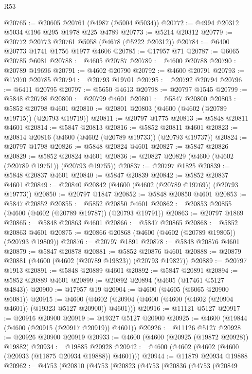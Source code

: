 \begin{lexlean}{R53}
\begin{coremodule}
@20765 := @20605 @20761 (@4987 (@5004 @5034))
@20772 := @4994 @20312 @5034 @196 @295 @1978 @225 @4789
@20773 := @5214 @20312
@20779 := @20772 @20773 @20761 @5058 (@4678 (@5222 @20312))
@20784 := @6400 @20773 @1741 @1756 @1977 @4606
@20785 := @17957 @71
@20787 := @6065 @20785 @6081
@20788 := @4605 @20787
@20789 := @4600 @20788
@20790 := @20789 @19696
@20791 := @4602 @20790
@20792 := @4600 @20791
@20793 := @17970 @20785
@20794 := @20793 @19701
@20795 := @20792 @20794
@20796 := @6411 @20795
@20797 := @5650 @4613
@20798 := @20797 @1545
@20799 := @5848 @20798
@20800 := @20799 @4601
@20801 := @5847 @20800
@20803 := @5852 @20798 @4601
@20810 := @20801 @20803 (@4600 (@4602 (@20789 @19715)) (@20793 @19719))
@20811 := @20797 @1775
@20813 := @5848 @20811 @4601
@20814 := @5847 @20813
@20816 := @5852 @20811 @4601
@20823 := @20814 @20816 (@4600 (@4602 (@20789 @19733)) (@20793 @19737))
@20824 := @20797 @1798
@20826 := @5848 @20824 @4601
@20827 := @5847 @20826
@20829 := @5852 @20824 @4601
@20836 := @20827 @20829 (@4600 (@4602 (@20789 @19751)) (@20793 @19755))
@20837 := @20797 @1825
@20839 := @5848 @20837 @4601
@20840 := @5847 @20839
@20842 := @5852 @20837 @4601
@20849 := @20840 @20842 (@4600 (@4602 (@20789 @19769)) (@20793 @19773))
@20850 := @20797 @1847
@20852 := @5848 @20850 @4601
@20853 := @5847 @20852
@20855 := @5852 @20850 @4601
@20862 := @20853 @20855 (@4600 (@4602 (@20789 @19787)) (@20793 @19791))
@20863 := @20797 @1869
@20865 := @5848 @20863 @4601
@20866 := @5847 @20865
@20868 := @5852 @20863 @4601
@20875 := @20866 @20868 (@4600 (@4602 (@20789 @19805)) (@20793 @19809))
@20876 := @20797 @1891
@20878 := @5848 @20876 @4601
@20879 := @5847 @20878
@20881 := @5852 @20876 @4601
@20888 := @20879 @20881 (@4600 (@4602 (@20789 @19823)) (@20793 @19827))
@20889 := @20797 @1913
@20891 := @5848 @20889 @4601
@20892 := @5847 @20891
@20894 := @5852 @20889 @4601
@20899 := @20892 @20894 (@4605 (@17461 @5127 @4843))
@20900 := @17957 @19
@20904 := @4600 (@4605 (@6065 @20900 @6081))
@20915 := @4600 (@4602 (@20904 (@4600 (@4600 (@4602 (@20904 @4601)) (@19323 @5127 @20900)) @4601)))
@20916 := @11121 @5127
@20917 := @20916 @20900
@20919 := @19327 @5127 @20900
@20925 := @4600 (@19844 (@4600 (@20915 (@20917 @20919)) @4601))
@20926 := @11126 @5127
@20928 := @20926 @20900 @20919
@20933 := @4600 (@4600 (@20925 (@19872 @20928)) @19882)
@20934 := @19885 @20928
@20942 := @4600 (@4602 (@4602 (@4600 (@20933 (@11875 @20934 @19888)) @4601)))
@20944 := @11879 @20934 @19888
@20962 := @4753
    (@20810
      (@4753
        (@20823
          (@4753
            (@20836
              (@4753
                (@20849

\end{coremodule}
\end{lexlean}
